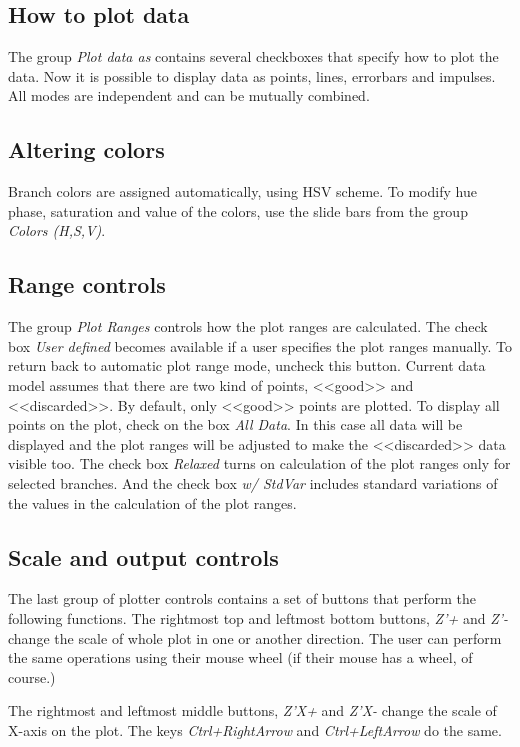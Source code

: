 \documentclass [10pt,letterpaper]{report}
\begin{document}
\subsection{How to plot data}
The group {\sl Plot data as} contains several checkboxes that specify
how to plot the data. Now it is possible to display data as points,
lines, errorbars and impulses. All modes are independent and can be
mutually combined.



\subsection{Altering colors}
Branch colors are assigned automatically, using HSV scheme. To modify
hue phase, saturation and value of the colors, use the slide bars from
the group {\sl Colors (H,S,V)}.



\subsection{Range controls}
The group {\sl Plot Ranges} controls how the plot ranges are
calculated. The check box {\sl User defined} becomes available if a
user specifies the plot ranges manually. To return back to automatic
plot range mode, uncheck this button. Current data model assumes that
there are two kind of points, <<good>> and <<discarded>>. By default,
only <<good>> points are plotted. To display all points on the plot,
check on the box {\sl All Data}. In this case all data will be
displayed and the plot ranges will be adjusted to make the <<discarded>>
data visible too. The check box {\sl Relaxed} turns on calculation of
the plot ranges only for selected branches. And the check box {\sl w/
StdVar} includes standard variations of the values in the calculation
of the plot ranges.



\subsection{Scale and output controls}
The last group of plotter controls contains a set of buttons that
perform the following functions. The rightmost top and leftmost bottom
buttons, {\sl Z'+} and {\sl Z'-} change the scale of whole plot in
one or another direction. The user can perform the same operations using
their mouse wheel (if their mouse has a wheel, of course.)

The rightmost and leftmost middle buttons, {\sl Z'X+} and {\sl Z'X-}
change the scale of X-axis on the plot. The keys {\sl Ctrl+RightArrow}
and {\sl Ctrl+LeftArrow} do the same.
\end{document}
